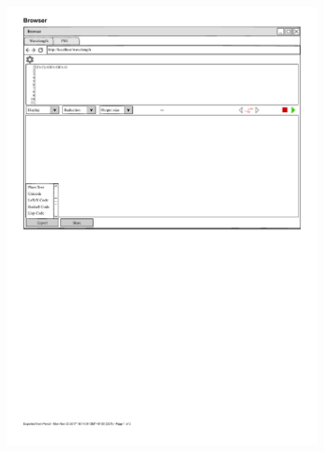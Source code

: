 \documentclass[parskip=full,11pt,twoside]{scrartcl}
\begin{document}
\begin{figure}[H]
	\begin{subfigure}{0.25\textwidth}
		\centering
		\includegraphics{img/exportMenu}
	\end{subfigure}
	\begin{subfigure}{0.75\textwidth}
		\centering

\end{subfigure}
\end{figure}
\end{document}
